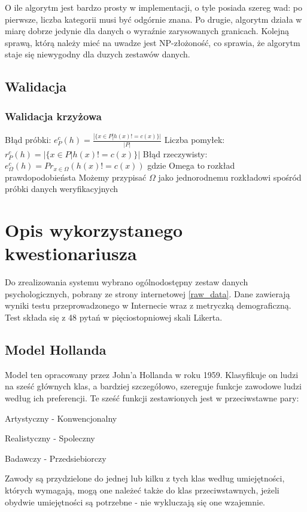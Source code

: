 \documentclass[12pt,a4paper,oneside]{report} %
\begin{document}
O ile algorytm jest bardzo prosty w implementacji, o tyle posiada szereg wad: po pierwsze, liczba kategorii musi być odgórnie znana. Po drugie, algorytm działa w miarę dobrze jedynie dla danych o wyraźnie zarysowanych granicach. Kolejną sprawą, którą należy mieć na uwadze jest NP-złożoność, co sprawia, że algorytm staje się niewygodny dla duzych zestawów danych.




\section{Walidacja}



\subsection{Walidacja krzyżowa}

Błąd próbki:
$    e_P^c(h) = \frac{| \{ x \in P | h(x) != c(x) \} |}{|P|} $
Liczba pomyłek:
$        r_P^c(h) = | \{ x \in P | h(x) != c(x) \} | $
Błąd rzeczywisty:
$    e_\Omega^c (h) = Pr_{x \in \Omega}(h(x) != c(x))$ gdzie Omega to rozkład prawdopodobieństa
Możemy przypisać $\Omega$ jako jednorodnemu rozkładowi spośród próbki danych weryfikacyjnych
            
            





\chapter{Opis wykorzystanego kwestionariusza}

Do zrealizowania systemu wybrano ogólnodostępny zestaw danych psychologicznych, pobrany ze strony internetowej \ref{raw_data}. Dane zawierają wyniki testu przeprowadzonego w Internecie wraz z metryczką demograficzną. Test składa się z 48 pytań w pięciostopniowej skali Likerta.

\section{Model Hollanda}

Model ten opracowany przez John'a Hollanda w roku 1959. \cite{holland-source} Klasyfikuje on ludzi na sześć głównych klas, a bardziej szczegółowo, szereguje funkcje zawodowe ludzi według ich preferencji. Te sześć funkcji zestawionych jest w przeciwstawne pary:\par
Artystyczny - Konwencjonalny\par
Realistyczny - Spoleczny\par
Badawczy - Przedsiebiorczy\par
Zawody są przydzielone do jednej lub kilku z tych klas według umiejętności, których wymagają, mogą one należeć także do klas przeciwstawnych, jeżeli obydwie umiejętności są potrzebne - nie wykluczają się one wzajemnie.\par
\end{document}
